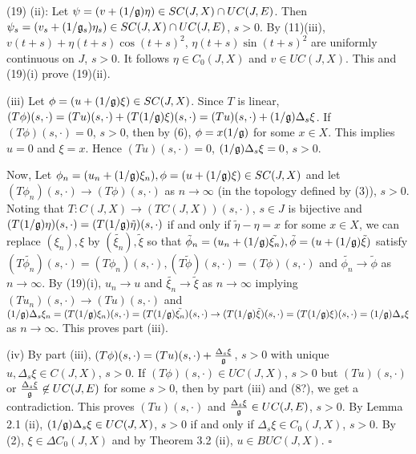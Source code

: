 \documentclass[10pt,onside,reqno]{amsart}
\theoremstyle{remark}
\theoremstyle{definition}
\begin{document}
(19) (ii): Let $\psi= (v + (1/\frak{g})\eta)\in  SC(J,X)\cap UC(J,E)$. Then $\psi_s= (v_s + (1/\frak{g}_s)\eta_s)\in  SC(J,X)\cap UC(J,E)$, $s >0$.  By (11)(iii), $v(t+s)+ \eta(t+s)\cos (t+s)^2 $,  $ \eta (t+s)\sin (t+s)^2 $  are uniformly continuous on $J$, $s >0$. It follows  $\eta\in C_0(J,X)$ and  $v\in UC(J,X)$. This and (19)(i) prove (19)(ii).


(iii) Let $\phi= (u + (1/\frak{g})\xi)\in  SC(J,X)$. Since $T$ is linear, $(T\phi)(s,\cdot)=(Tu)(s,\cdot)+ (T(1/\frak{g})\xi)(s,\cdot)=(Tu)(s,\cdot)+ (1/\frak{g})\Delta_s\xi$. If   $(T\phi)(s,\cdot)=0$, $s >0$, then by (6), $\phi = x (1/\frak{g})$ for some $x\in X$. This implies  $u=0$ and $\xi=
 x$. Hence $(Tu)(s,\cdot)=0$, $(1/\frak{g})\Delta_s\xi=0$, $s > 0$.


Now, Let $\phi_n= (u_n +(1/\frak{g})\xi_n), \phi= (u +(1/\frak{g})\xi) \in  SC(J,X)$ and let  $(T\phi_n)(s,\cdot)\to  (T\phi)(s,\cdot)$ as $n\to \infty$ (in the topology defined by (3)), $s > 0$. Noting that $T: C(J,X)\to (TC(J,X))(s,\cdot) $, $s\in J$ is bijective and $(T(1/\frak{g})\eta)(s,\cdot)=(T(1/\frak{g})\tilde{\eta})(s,\cdot)$ if and only if $\tilde{\eta}-\eta=x$ for some $x\in X$, we can replace $(\xi_n), \xi$ by $(\tilde{\xi_n}), \tilde{\xi}$ so that $\tilde{\phi}_n= (u_n +(1/\frak{g})\tilde{\xi_n}), \tilde{\phi}= (u +(1/\frak{g})\tilde{\xi})$ satisfy
$(T\tilde{\phi_n})(s,\cdot)=(T\phi_n)(s,\cdot), (T\tilde{\phi})(s,\cdot)=(T\phi)(s,\cdot)$ and  $\tilde{\phi_n}\to \tilde{ \phi}$ as $n\to \infty$. By (19)(i), $u_n \to u$  and $\tilde {\xi_n}\to \tilde {\xi}$ as $n\to \infty$ implying $(Tu_n)(s,\cdot)\to  (Tu)(s,\cdot)$ and
$ (1/\frak{g}) {\Delta_s \xi_n}=(T(1/\frak{g}) {\xi_n})(s,\cdot)=(T(1/\frak{g})\tilde {\xi_n})(s,\cdot)\to  (T(1/\frak{g})\tilde {\xi})(s,\cdot)=(T(1/\frak{g}){\xi})(s,\cdot)= (1/\frak{g})\Delta_s {\xi}$ as $n\to \infty$. This proves  part (iii).


(iv) By part (iii), $(T\phi)(s,\cdot)= (Tu)(s,\cdot)+\frac{\Delta_s \xi}{\frak{g}}$, $s > 0$ with unique $u, \Delta_s \xi \in C(J,X)$, $s> 0$.
   If $(T\phi)(s,\cdot)\in UC(J,X)$, $s > 0$  but  $(Tu)(s,\cdot)$ or $\frac{\Delta_s \xi}{\frak{g}} \not \in UC(J,E)$ for some  $s > 0$,  then by part (iii) and (8?), we get a contradiction. This proves $(Tu)(s,\cdot)$ and  $\frac{\Delta_s \xi}{\frak{g}} \in UC(J,E)$, $s > 0$. By Lemma 2.1 (ii), $(1/\frak{g})\Delta_s \xi\in UC(J,X)$, $s > 0$ if and only if $\Delta_s \xi\in C_0(J,X)$, $s > 0$. By (2), $\xi\in \Delta C_0 (J,X)$ and by Theorem 3.2 (ii), $u\in BUC(J,X)$.
$\square$
\end{document}
